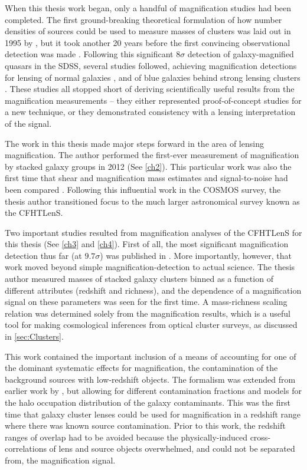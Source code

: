 When this thesis work began, only a handful of magnification studies had been completed. The first ground-breaking theoretical formulation of how number densities of sources could be used to measure masses of clusters was laid out in 1995 by \citet{Broadhurst95}, but it took another 20 years before the first convincing observational detection was made \citep{Scranton05}. Following this significant $8\sigma$ detection of galaxy-magnified quasars in the \acf{SDSS}, several studies followed, achieving magnification detections for lensing of normal galaxies \citep{Hildebrandt09b}, and of blue galaxies behind strong lensing clusters \citep{Umetsu11}. These studies all stopped short of deriving scientifically useful results from the magnification measurements -- they either represented proof-of-concept studies for a new technique, or they demonstrated consistency with a lensing interpretation of the signal.

The work in this thesis made major steps forward in the area of lensing magnification. The author performed the first-ever measurement of magnification by stacked galaxy groups in 2012 (See \autoref{ch2}). This particular work was also the first time that shear and magnification mass estimates and signal-to-noise had been compared \citep{Ford12}. Following this influential work in the \acf{COSMOS} survey, the thesis author transitioned focus to the much larger astronomical survey known as the \acf{CFHTLenS}. 

Two important studies resulted from magnification analyses of the \ac{CFHTLenS} for this thesis (See \autoref{ch3} and \autoref{ch4}). First of all, the most significant magnification detection thus far (at $9.7\sigma$) was published in \citet{Ford14}. More importantly, however, that work moved beyond simple magnification-detection to actual science. The thesis author measured masses of stacked galaxy clusters binned as a function of different attributes (redshift and richness), and the dependence of a magnification signal on these parameters was seen for the first time. A mass-richness scaling relation was determined solely from the magnification results, which is a useful tool for making cosmological inferences from optical cluster surveys, as discussed in \autoref{sec:Clusters}. 

This work contained the important inclusion of a means of accounting for one of the dominant systematic effects for magnification, the contamination of the background sources with low-redshift objects. The formalism was extended from earlier work by \citet{Hildebrandt13}, but allowing for different contamination fractions and models for the halo occupation distribution of the galaxy contaminants. This was the first time that galaxy cluster lenses could be used for magnification in a redshift range where there was known source contamination. Prior to this work, the redshift ranges of overlap had to be avoided because the physically-induced cross-correlations of lens and source objects overwhelmed, and could not be separated from, the magnification signal.

